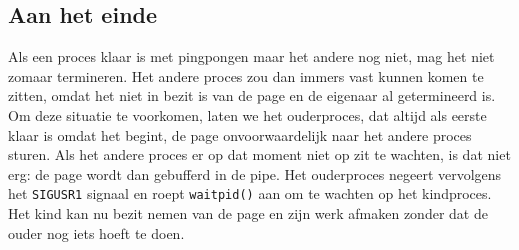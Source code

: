 \documentclass[11pt]{article}
\begin{document}
\subsection*{Aan het einde}
Als een proces klaar is met pingpongen maar het andere nog niet, mag het niet zomaar termineren. Het andere proces zou dan immers
vast kunnen komen te zitten, omdat het niet in bezit is van de page en de eigenaar al getermineerd is. Om deze situatie te voorkomen,
laten we het ouderproces, dat altijd als eerste klaar is omdat het begint, de page onvoorwaardelijk naar het andere proces sturen.
Als het andere proces er op dat moment niet op zit te wachten, is dat niet erg: de page wordt dan gebufferd in de pipe. Het ouderproces
negeert vervolgens het \verb+SIGUSR1+ signaal en roept \verb+waitpid()+ aan om te wachten op het kindproces. Het kind kan nu bezit
nemen van de page en zijn werk afmaken zonder dat de ouder nog iets hoeft te doen.
\end{document}

